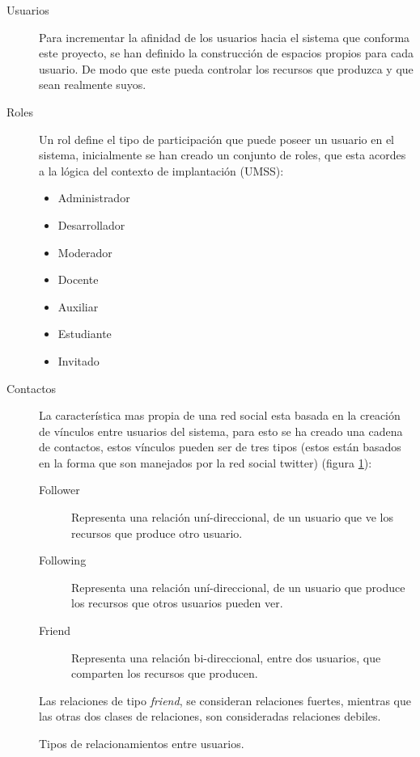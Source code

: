 \begin{description}
\item [Usuarios] Para incrementar la afinidad de los usuarios hacia el sistema
que conforma este proyecto, se han definido la construcción de espacios propios
para cada usuario. De modo que este pueda controlar los recursos que produzca y
que sean realmente suyos.
\item [Roles] Un rol define el tipo de participación que puede poseer un usuario
en el sistema, inicialmente se han creado un conjunto de roles, que esta acordes
a la lógica del contexto de implantación (UMSS):
    \begin{itemize}
    \item Administrador
    \item Desarrollador
    \item Moderador
    \item Docente
    \item Auxiliar
    \item Estudiante
    \item Invitado
    \end{itemize}
\item [Contactos] La característica mas propia de una red social esta basada en
la creación de vínculos entre usuarios del sistema, para esto se ha creado una
cadena de contactos, estos vínculos pueden ser de tres tipos (estos están
basados en la forma que son manejados por la red social twitter) (figura
\ref{contactos}):
\begin{description}
\item [Follower] Representa una relación uní-direccional, de un usuario que
ve los recursos que produce otro usuario.
\item [Following] Representa una relación uní-direccional, de un usuario que
produce los recursos que otros usuarios pueden ver.
\item [Friend] Representa una relación bi-direccional, entre dos usuarios,
que comparten los recursos que producen.
\end{description}
Las relaciones de tipo \emph{friend}, se consideran relaciones fuertes, mientras
que las otras dos clases de relaciones, son consideradas relaciones debiles.
\end{description}

\begin{figure}
\centering

\caption{Tipos de relacionamientos entre usuarios.}
\label{contactos}
\end{figure}

